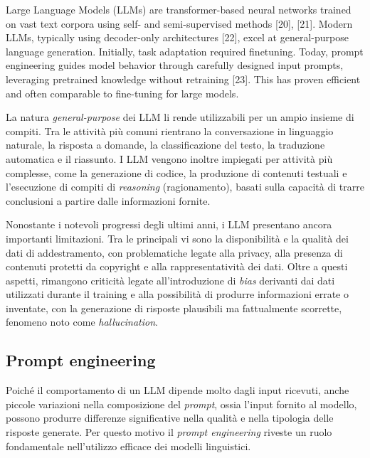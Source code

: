 Large Language Models (LLMs) are transformer-based neural networks trained on vast text corpora using self- and semi-supervised methods [20], [21]. Modern LLMs, typically using decoder-only architectures [22], excel at general-purpose language generation. Initially, task adaptation required finetuning. Today, prompt engineering guides model behavior through carefully designed input prompts, leveraging pretrained knowledge without retraining [23]. This has proven efficient and often comparable to fine-tuning for large models. \cite{basque2026decompiling}


La natura \textit{general-purpose} dei LLM li rende utilizzabili per un ampio insieme di compiti. Tra le attività più comuni rientrano la conversazione in linguaggio naturale, la risposta a domande, la classificazione del testo, la traduzione automatica e il riassunto. I LLM vengono inoltre impiegati per attività più complesse, come la generazione di codice, la produzione di contenuti testuali e l'esecuzione di compiti di \textit{reasoning} (ragionamento), basati sulla capacità di trarre conclusioni a partire dalle informazioni fornite. \cite{dhamani2026genai} %

Nonostante i notevoli progressi degli ultimi anni, i LLM presentano ancora importanti limitazioni. Tra le principali vi sono la disponibilità e la qualità dei dati di addestramento, con problematiche legate alla privacy, alla presenza di contenuti protetti da copyright e alla rappresentatività dei dati. Oltre a questi aspetti, rimangono criticità legate all'introduzione di \textit{bias} derivanti dai dati utilizzati durante il training e alla possibilità di produrre informazioni errate o inventate, con la generazione di risposte plausibili ma fattualmente scorrette, fenomeno noto come \textit{hallucination}. \cite{dhamani2026genai} %

\subsection{Prompt engineering} %

Poiché il comportamento di un LLM dipende molto dagli input ricevuti, anche piccole variazioni nella composizione del \textit{prompt}, ossia l'input fornito al modello, possono produrre differenze significative nella qualità e nella tipologia delle risposte generate. Per questo motivo il \textit{prompt engineering} riveste un ruolo fondamentale nell'utilizzo efficace dei modelli linguistici.

